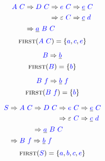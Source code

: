 \documentclass{article}
\newcommand{\FIRST}{\textsc{first}}
\newcommand{\Symbol}[1]{\textcolor{blue}{#1}}
\newcommand{\Null}{\varepsilon}
\newcommand{\Derive}{\Rightarrow}
\newcommand{\Seq}{\ }
\begin{document}
\begin{equation*}
  \Symbol{A} \Seq \Symbol{C} \begin{aligned}[t]
    &\Derive \Symbol{D} \Seq \Symbol{C} \begin{aligned}[t]
      &\Derive \Symbol{e} \Seq \Symbol{C} \Derive \underline{\Symbol{e}} \Seq \Symbol{C} \\
      &\Derive \Null \Seq \Symbol{C} \Derive \underline{\Symbol{c}} \Seq \Symbol{d} \\
    \end{aligned}\\
    &\Derive \underline{\Symbol{a}} \Seq \Symbol{B} \Seq \Symbol{C}
  \end{aligned}
\end{equation*}
\begin{equation*}
  \FIRST(\Symbol{A} \Seq \Symbol{C}) = \{\Symbol{a}, \Symbol{c}, \Symbol{e}\}
\end{equation*}

\begin{equation*}
  \Symbol{B} \Derive \underline{\Symbol{b}}
\end{equation*}
\begin{equation*}
  \FIRST(\Symbol{B}) = \{\Symbol{b}\}
\end{equation*}

\begin{equation*}
  \Symbol{B} \Seq \Symbol{f} \Derive \underline{\Symbol{b}} \Seq \Symbol{f}
\end{equation*}
\begin{equation*}
  \FIRST(\Symbol{B} \Seq \Symbol{f}) = \{\Symbol{b}\}
\end{equation*}

\begin{equation*}
  \Symbol{S} \begin{aligned}[t]
    &\Derive \Symbol{A} \Seq \Symbol{C} \begin{aligned}[t]
      &\Derive \Symbol{D} \Seq \Symbol{C} \begin{aligned}[t]
        &\Derive \Symbol{e} \Seq \Symbol{C} \Derive \underline{\Symbol{e}} \Seq \Symbol{C} \\
        &\Derive \Null \Seq \Symbol{C} \Derive \underline{\Symbol{c}} \Seq \Symbol{d} \\
      \end{aligned}\\
      &\Derive \underline{\Symbol{a}} \Seq \Symbol{B} \Seq \Symbol{C}
    \end{aligned}\\
    &\Derive \Symbol{B} \Seq \Symbol{f} \Derive \underline{\Symbol{b}} \Seq \Symbol{f}
  \end{aligned}
\end{equation*}
\begin{equation*}
  \FIRST(\Symbol{S}) = \{\Symbol{a}, \Symbol{b}, \Symbol{c}, \Symbol{e}\}
\end{equation*}
\end{document}
